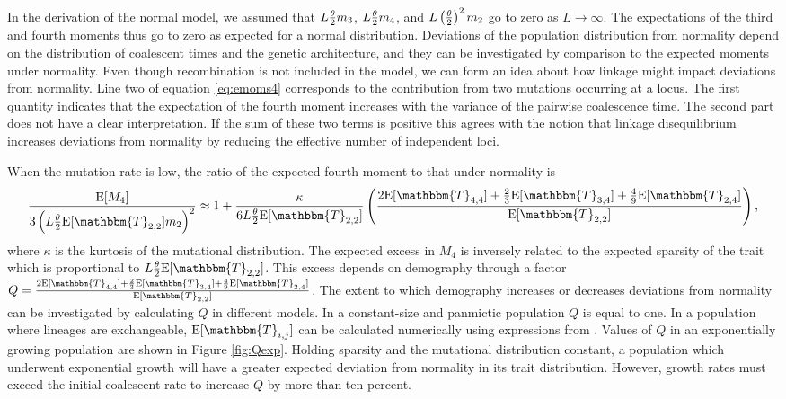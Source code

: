 In the derivation of the normal model, we assumed that $L\frac{\theta}{2} m_3$, $L \frac{\theta}{2} m_4$,
and $L \left( \frac{\theta}{2} \right)^2 m_2$ go to zero as $L\to \infty$. The expectations of
the third and fourth moments thus go to zero as expected for a normal
distribution. Deviations of the population distribution from normality depend on
the distribution of coalescent times and the genetic architecture, and they can
be investigated by comparison to the expected moments under normality. Even
though recombination is not included in the model, we can form an idea about how
linkage might impact deviations from normality. Line two of
equation \eqref{eq:emoms4} corresponds to the contribution from two mutations
occurring at a locus. The first quantity indicates that the expectation of the
fourth moment increases with the variance of the pairwise coalescence time. The
second part does not have a clear interpretation. If the sum of these two terms
is positive this agrees with the notion that linkage disequilibrium increases
deviations from normality by reducing the effective number of independent loci.

When the mutation rate is low, the ratio of the expected fourth moment to that
under normality is
\begin{equation}
  \label{eq:popmom4coal}
  \frac{\E[M_4]}{3\left(L \T \E[\mathbbm{T}_{2,2}] m_2\right)^2} \approx 1 +
  \frac{\kappa}{6 L \T \E[\mathbbm{T}_{2,2}]}\left( \frac{2\E[\mathbbm{T}_{4,4}] +
      \frac{2}{3}\E[\mathbbm{T}_{3,4}] +
      \frac{4}{9}\E[\mathbbm{T}_{2,4}]}{\E[\mathbbm{T}_{2,2}]}\right),
\end{equation}
where $\kappa$ is the kurtosis of the mutational distribution. The expected
excess in $M_4$ is inversely related to the expected sparsity of the trait which
is proportional to $L \T \E[\mathbbm{T}_{2,2}]$. This excess depends on
demography through a factor $Q = \frac{2\E[\mathbbm{T}_{4,4}] +
  \frac{2}{3}\E[\mathbbm{T}_{3,4}] +
  \frac{4}{9}\E[\mathbbm{T}_{2,4}]}{\E[\mathbbm{T}_{2,2}]}$. The extent to which
demography increases or decreases deviations from normality can be investigated
by calculating $Q$ in different models. In a constant-size and panmictic
population $Q$ is equal to one. In a population where lineages are exchangeable,
$\E[\mathbbm{T}_{i,j}]$ can be calculated numerically using expressions from
\citet{Griffiths1998}. Values of $Q$ in an exponentially growing population are
shown in Figure \ref{fig:Qexp}. Holding sparsity and the mutational distribution
constant, a population which underwent exponential growth will have a greater
expected deviation from normality in its trait distribution. However, growth
rates must exceed the initial coalescent rate to increase $Q$ by more than ten
percent.

